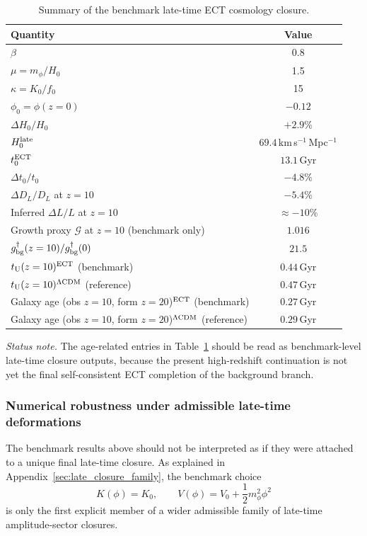 \documentclass[11pt,a4paper]{article}
\numberwithin{equation}{section}
\begin{document}
\begin{table}[htb]
\centering
\caption{Summary of the benchmark late-time ECT cosmology closure.}
\label{tab:ect_hubble_jwst_summary}
\renewcommand{\arraystretch}{1.15}
\begin{tabular}{lc}
\hline\hline
Quantity & Value \\
\hline
$\beta$ & 0.8 \\
$\mu=m_\phi/H_0$ & 1.5 \\
$\kappa=K_0/f_0$ & 15 \\
$\phi_0=\phi(z=0)$ & $-0.12$ \\
$\Delta H_0/H_0$ & $+2.9\%$ \\
$H_0^{\rm late}$ & $69.4$\,km\,s$^{-1}$\,Mpc$^{-1}$ \\
$t_0^{\rm ECT}$ & $13.1$\,Gyr \\
$\Delta t_0/t_0$ & $-4.8\%$ \\
$\Delta D_L/D_L$ at $z=10$ & $-5.4\%$ \\
Inferred $\Delta L/L$ at $z=10$ & $\approx -10\%$ \\
Growth proxy $\mathcal{G}$ at $z=10$ (benchmark only) & $1.016$ \\
$g^\dagger_{\rm bg}(z=10)/g^\dagger_{\rm bg}(0)$ & $21.5$ \\
$t_{\rm U}(z=10)^{\rm ECT}$ (benchmark) & $0.44$\,Gyr \\
$t_{\rm U}(z=10)^{\Lambda{\rm CDM}}$ (reference) & $0.47$\,Gyr \\
Galaxy age (obs $z=10$, form $z=20$)$^{\rm ECT}$ (benchmark) & $0.27$\,Gyr \\
Galaxy age (obs $z=10$, form $z=20$)$^{\Lambda{\rm CDM}}$ (reference) & $0.29$\,Gyr \\
\hline\hline
\end{tabular}
\end{table}

\noindent
\textit{Status note.}
The age-related entries in Table~\ref{tab:ect_hubble_jwst_summary}
should be read as benchmark-level late-time closure outputs,
because the present high-redshift continuation is not yet the final
self-consistent ECT completion of the background branch.

\subsubsection*{Numerical robustness under admissible late-time deformations}
\label{sec:late_cosmo_robustness_main}

The benchmark results above should not be interpreted as if they were
attached to a unique final late-time closure.
As explained in Appendix~\ref{sec:late_closure_family}, the benchmark
choice
\[
K(\phi)=K_0,
\qquad
V(\phi)=V_0+\frac12 m_\phi^2\phi^2
\]
is only the first explicit member of a wider admissible family of
late-time amplitude-sector closures.
\end{document}

